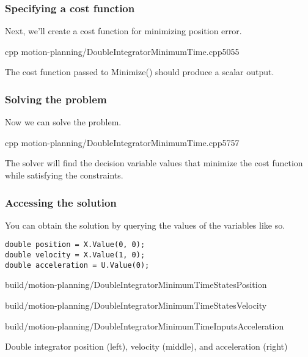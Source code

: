 \subsubsection{Specifying a cost function}

Next, we'll create a cost function for minimizing position error.
\begin{coderemotesubset}{cpp}
  {motion-planning/DoubleIntegratorMinimumTime.cpp}{50}{55}
\end{coderemotesubset}

The cost function passed to Minimize() should produce a scalar output.

\subsubsection{Solving the problem}

Now we can solve the problem.
\begin{coderemotesubset}{cpp}
  {motion-planning/DoubleIntegratorMinimumTime.cpp}{57}{57}
\end{coderemotesubset}

The solver will find the decision variable values that minimize the cost
function while satisfying the constraints.

\subsubsection{Accessing the solution}

You can obtain the solution by querying the values of the variables like so.
\begin{code}
  \begin{lstlisting}[style=customCpp]
double position = X.Value(0, 0);
double velocity = X.Value(1, 0);
double acceleration = U.Value(0);
  \end{lstlisting}
\end{code}
\begin{bookfigure}
  \begin{minisvg}{3}
    {build/motion-planning/DoubleIntegratorMinimumTimeStatesPosition}
  \end{minisvg}
  \hfill
  \begin{minisvg}{3}
    {build/motion-planning/DoubleIntegratorMinimumTimeStatesVelocity}
  \end{minisvg}
  \hfill
  \begin{minisvg}{3}
    {build/motion-planning/DoubleIntegratorMinimumTimeInputsAcceleration}
  \end{minisvg}
  \caption{Double integrator position (left), velocity (middle), and
    acceleration (right)}
\end{bookfigure}

